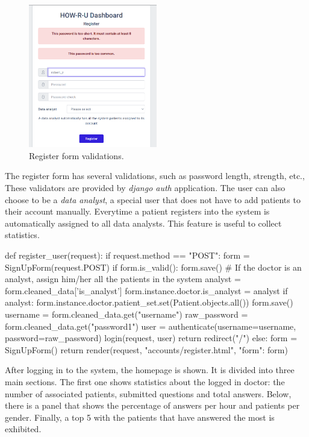 \documentclass[12pt,english]{article}
\begin{document}
\begin{figure}[H]
    \centering
    \includegraphics[width=0.5\textwidth]{register_error.png}
    \caption{Register form validations.}
\end{figure}

The register form has several validations, such as password length, strength, etc., These validators are provided by \emph{django auth} application. The user can also choose to be a \emph{data analyst}, a special user that does not have to add patients to their account manually. Everytime a patient registers into the system is automatically assigned to all data analysts. This feature is useful to collect statistics.

\begin{python}[caption={Method to register an user in the system}, captionpos=b]
  def register_user(request):
    if request.method == "POST":
        form = SignUpForm(request.POST)
        if form.is_valid():
            form.save()
            # If the doctor is an analyst, assign him/her all the patients in the system
            analyst = form.cleaned_data['is_analyst']
            form.instance.doctor.is_analyst = analyst
            if analyst:
                form.instance.doctor.patient_set.set(Patient.objects.all())
            form.save()
            username = form.cleaned_data.get("username")
            raw_password = form.cleaned_data.get("password1")
            user = authenticate(username=username, password=raw_password)
            login(request, user)
            return redirect("/")
    else:
        form = SignUpForm()
    return render(request, "accounts/register.html", {"form": form})
\end{python}

After logging in to the system, the homepage is shown. It is divided into three main sections. The first one shows statistics about the logged in doctor: the number of associated patients, submitted questions and total answers. Below, there is a panel that shows the percentage of answers per hour and patients per gender. Finally, a top 5 with the patients that have answered the most is exhibited.
\end{document}
